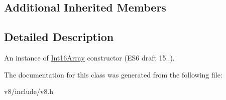 \subsection*{Additional Inherited Members}


\subsection{Detailed Description}
An instance of \mbox{\hyperlink{classv8_1_1Int16Array}{Int16\+Array}} constructor (E\+S6 draft 15..). 

The documentation for this class was generated from the following file\+:\begin{DoxyCompactItemize}
\item 
v8/include/v8.\+h\end{DoxyCompactItemize}
